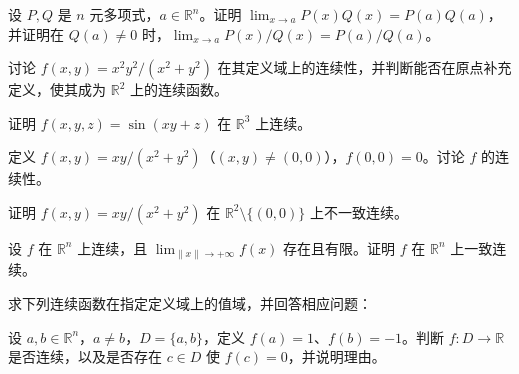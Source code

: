 \noindent\begin{minipage}{\textwidth}
设 $P,Q$ 是 $n$ 元多项式，$a\in\mathbb R^n$。证明 $\lim_{x\to a}P(x)Q(x)=P(a)Q(a)$，并证明在 $Q(a)\ne0$ 时，$\lim_{x\to a}P(x)/Q(x)=P(a)/Q(a)$。
\end{minipage}\par\vfill
\newpage
\noindent\begin{minipage}{\textwidth}
讨论 $f(x,y)=x^2y^2/(x^2+y^2)$ 在其定义域上的连续性，并判断能否在原点补充定义，使其成为 $\mathbb R^2$ 上的连续函数。
\end{minipage}\par\vfill
\noindent\begin{minipage}{\textwidth}
证明 $f(x,y,z)=\sin(xy+z)$ 在 $\mathbb R^3$ 上连续。
\end{minipage}\par\vfill
\noindent\begin{minipage}{\textwidth}
定义 $f(x,y)=xy/(x^2+y^2)$（$(x,y)\ne(0,0)$），$f(0,0)=0$。讨论 $f$ 的连续性。
\end{minipage}\par\vfill
\newpage
\noindent\begin{minipage}{\textwidth}
证明 $f(x,y)=xy/(x^2+y^2)$ 在 $\mathbb R^2\setminus\{(0,0)\}$ 上不一致连续。
\end{minipage}\par\vfill
\noindent\begin{minipage}{\textwidth}
设 $f$ 在 $\mathbb R^n$ 上连续，且 $\lim_{\|x\|\to+\infty}f(x)$ 存在且有限。证明 $f$ 在 $\mathbb R^n$ 上一致连续。
\end{minipage}\par\vfill
\noindent\begin{minipage}{\textwidth}
求下列连续函数在指定定义域上的值域，并回答相应问题：
\SubQ{2}{$f(x)=1/x$，$D=[1,+\infty)$：值域是否为闭集？}
\end{minipage}\par\vfill
\newpage
\noindent\begin{minipage}{\textwidth}
设 $a,b\in\mathbb R^n$，$a\ne b$，$D=\{a,b\}$，定义 $f(a)=1$、$f(b)=-1$。判断 $f:D\to\mathbb R$ 是否连续，以及是否存在 $c\in D$ 使 $f(c)=0$，并说明理由。
\end{minipage}\par\vfill
